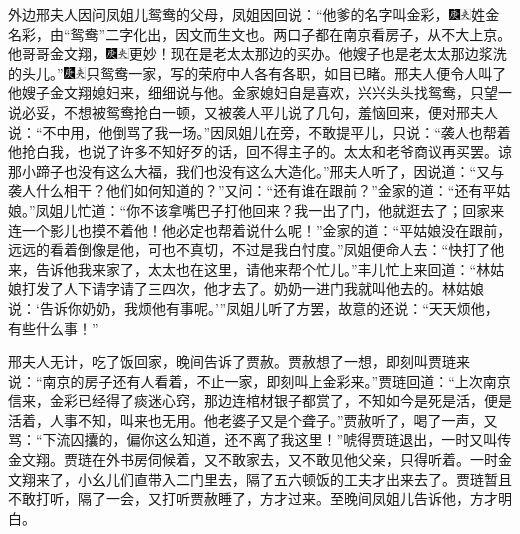 外边邢夫人因问凤姐儿鸳鸯的父母，凤姐因回说：``他爹的名字叫金彩，{\includegraphics[width=3mm]{../Images/00004}\includegraphics[width=3mm]{../Images/00012}\footnotesize \kaishu 姓金名彩，由``鸳鸯''二字化出，因文而生文也。}两口子都在南京看房子，从不大上京。他哥哥金文翔，{\includegraphics[width=3mm]{../Images/00004}\includegraphics[width=3mm]{../Images/00012}\footnotesize \kaishu 更妙！}现在是老太太那边的买办。他嫂子也是老太太那边浆洗的头儿。''{\includegraphics[width=3mm]{../Images/00004}\includegraphics[width=3mm]{../Images/00012}\footnotesize \kaishu 只鸳鸯一家，写的荣府中人各有各职，如目已睹。}邢夫人便令人叫了他嫂子金文翔媳妇来，细细说与他。金家媳妇自是喜欢，兴兴头头找鸳鸯，只望一说必妥，不想被鸳鸯抢白一顿，又被袭人平儿说了几句，羞恼回来，便对邢夫人说：``不中用，他倒骂了我一场。''因凤姐儿在旁，不敢提平儿，只说：``袭人也帮着他抢白我，也说了许多不知好歹的话，回不得主子的。太太和老爷商议再买罢。谅那小蹄子也没有这么大福，我们也没有这么大造化。''邢夫人听了，因说道：``又与袭人什么相干？他们如何知道的？''又问：``还有谁在跟前？''金家的道：``还有平姑娘。''凤姐儿忙道：``你不该拿嘴巴子打他回来？我一出了门，他就逛去了；回家来连一个影儿也摸不着他！他必定也帮着说什么呢！''金家的道：``平姑娘没在跟前，远远的看着倒像是他，可也不真切，不过是我白忖度。''凤姐便命人去：``快打了他来，告诉他我来家了，太太也在这里，请他来帮个忙儿。''丰儿忙上来回道：``林姑娘打发了人下请字请了三四次，他才去了。奶奶一进门我就叫他去的。林姑娘说：`告诉你奶奶，我烦他有事呢。'''凤姐儿听了方罢，故意的还说：``天天烦他，有些什么事！''

邢夫人无计，吃了饭回家，晚间告诉了贾赦。贾赦想了一想，即刻叫贾琏来说：``南京的房子还有人看着，不止一家，即刻叫上金彩来。''贾琏回道：``上次南京信来，金彩已经得了痰迷心窍，那边连棺材银子都赏了，不知如今是死是活，便是活着，人事不知，叫来也无用。他老婆子又是个聋子。''贾赦听了，喝了一声，又骂：``下流囚攮的，偏你这么知道，还不离了我这里！''唬得贾琏退出，一时又叫传金文翔。贾琏在外书房伺候着，又不敢家去，又不敢见他父亲，只得听着。一时金文翔来了，小幺儿们直带入二门里去，隔了五六顿饭的工夫才出来去了。贾琏暂且不敢打听，隔了一会，又打听贾赦睡了，方才过来。至晚间凤姐儿告诉他，方才明白。

